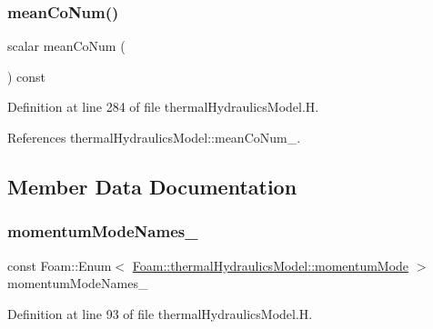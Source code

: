 \subsubsection{\texorpdfstring{mean\+Co\+Num()}{meanCoNum()}}
{\footnotesize\ttfamily scalar mean\+Co\+Num (\begin{DoxyParamCaption}{ }\end{DoxyParamCaption}) const\hspace{0.3cm}{\ttfamily [inline]}}



Definition at line 284 of file thermal\+Hydraulics\+Model.\+H.



References thermal\+Hydraulics\+Model\+::mean\+Co\+Num\+\_\+.



\subsection{Member Data Documentation}
\mbox{\label{classFoam_1_1thermalHydraulicsModel_a0e02db1ed615d7361ee1f583e8f59416}} 
\subsubsection{\texorpdfstring{momentum\+Mode\+Names\+\_\+}{momentumModeNames\_}}
{\footnotesize\ttfamily const Foam\+::\+Enum$<$ \hyperlink{classFoam_1_1thermalHydraulicsModel_a75b783d2202a216abbc0ef52858e2267}{Foam\+::thermal\+Hydraulics\+Model\+::momentum\+Mode} $>$ momentum\+Mode\+Names\+\_\+\hspace{0.3cm}{\ttfamily [static]}}



Definition at line 93 of file thermal\+Hydraulics\+Model.\+H.

\mbox{\label{classFoam_1_1thermalHydraulicsModel_a4659eb289beeeef5f54215ac0ea1940e}} 
